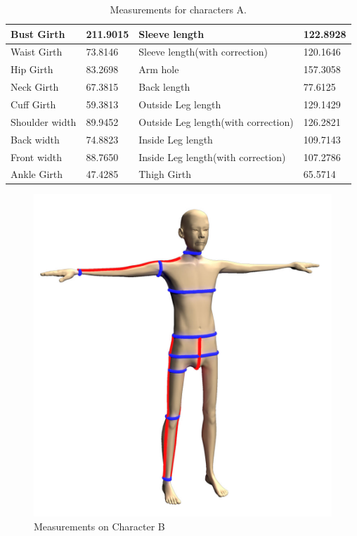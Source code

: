\begin{table}[H]
    \centering
    \begin{tabular}{|p{3.4cm}|p{1.8cm}|p{3.4cm}|p{1.8cm}|}
        \hline
        Bust Girth & 211.9015 & Sleeve length & 122.8928\\
        \hline
        Waist Girth & 73.8146 & Sleeve length\newline(with correction) & 120.1646\\
        \hline
        Hip Girth & 83.2698 & Arm hole & 157.3058\\
        \hline
        Neck Girth &67.3815 & Back length & 77.6125\\
        \hline
        Cuff Girth &59.3813 & Outside Leg length & 129.1429\\
        \hline
        Shoulder width &89.9452 & Outside Leg length\newline(with correction)& 126.2821\\
        \hline
        Back width &74.8823 & Inside Leg length & 109.7143\\
        \hline
        Front width &88.7650 & Inside Leg length\newline(with correction) & 107.2786 \\
        \hline  
        Ankle  Girth & 47.4285 & Thigh Girth & 65.5714 \\
        \hline                      
    \end{tabular}
    \caption{Measurements for characters A.} %
    \label{table:measurements_result_A}
\end{table}

  
\begin{figure}[H]
\includegraphics[width=\textwidth]{../images/geodesic_image/B_measurement}
\caption{Measurements on Character B}
\label{figure:B_all_measurement} 
\end{figure}

